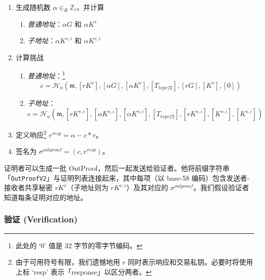 \begin{enumerate}
	\item 生成随机数 $\alpha \in_R \mathbb{Z}_l$，并计算
	\begin{enumerate}
	    \item {\em 普通地址}：$\alpha G$ 和 $\alpha K^v$
	    \item {\em 子地址}：$\alpha K^{s,i}$ 和 $\alpha K^{v,i}$
	\end{enumerate}{}
	\item 计算挑战
	\begin{enumerate}
	    \item {\em 普通地址}：\footnote{此处的 `0' 值是 32 字节的零字节编码。}
	    \[c = \mathcal{H}_n(\mathfrak{m},[rK^v], [\alpha G], [\alpha K^v], [T_{txprf2}], [rG], [K^v], [0])\]
	    \item {\em 子地址}：
	    \[c = \mathcal{H}_n(\mathfrak{m},[rK^{v,i}], [\alpha K^{s,i}], [\alpha K^{v,i}], [T_{txprf2}], [rK^{s,i}], [K^{v,i}], [K^{s,i}])\]
	\end{enumerate}{}
	\item 定义响应\footnote{由于可用符号有限，我们遗憾地用 $r$ 同时表示响应和交易私钥。必要时将使用上标 `resp' 表示「response」以区分两者。} $r^{resp} = \alpha - c*r$。
	\item 签名为 $\sigma^{outproof} = (c, r^{resp})$。
\end{enumerate}{}

证明者可以生成一批 OutProof，然后一起发送给验证者。他将前缀字符串「{\tt OutProofV2}」与证明列表连接起来，其中每项（以 base-58 编码）包含发送者-接收者共享秘密 $r K^v$（子地址则为 $r K^{v,i}$）及其对应的 $\sigma^{outproof}$。我们假设验证者知道每条证明对应的地址。

\subsubsection*{验证 (Verification)}


